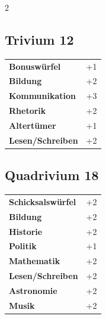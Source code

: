\begin{multicols}{2}
\begin{tcolorbox}

\end{tcolorbox}

\begin{tcolorbox}
    \subsection*{Trivium \hfill \small{12 }}
    \tcblower




\begin{tabular}{@{}ll@{}}
    \textbf{Bonuswürfel} & +1\\
    \textbf{Bildung} & +2\\
    \textbf{Kommunikation} & +3\\
    \textbf{Rhetorik} & +2\\
    \textbf{Altertümer} & +1\\
    \textbf{Lesen/Schreiben} & +2\\
\end{tabular}


\end{tcolorbox}

\begin{tcolorbox}
    \subsection*{Quadrivium \hfill \small{18 }}
    \tcblower




\begin{tabular}{@{}ll@{}}
    \textbf{Schicksalswürfel} & +2\\
    \textbf{Bildung} & +2\\
    \textbf{Historie} & +2\\
    \textbf{Politik} & +1\\
    \textbf{Mathematik} & +2\\
    \textbf{Lesen/Schreiben} & +2\\
    \textbf{Astronomie} & +2\\
    \textbf{Musik} & +2\\
\end{tabular}


\end{tcolorbox}
\end{multicols}
